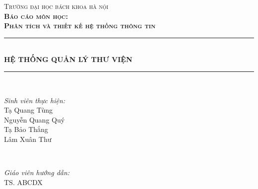 \documentclass[../report.tex]{subfiles}
\begin{document}
\begin{titlepage}

\newcommand{\HRule}{\rule{\linewidth}{0.5mm}} %

\center %
 
\textsc{\LARGE Trường đại học bách khoa hà nội}\\[1cm] %
\textsc{\large\bfseries Báo cáo môn học:} \\[0.2cm]
\textsc{\LARGE\bfseries Phân tích và thiết kế hệ thống thông tin}\\[1cm] %

\HRule \\[0.4cm]
{\Huge \bfseries HỆ THỐNG QUẢN LÝ THƯ VIỆN}\\[0.3cm] %
\HRule \\[1.5cm]

 
\begin{minipage}{0.4\textwidth}
\begin{flushleft} \large
\emph{Sinh viên thực hiện:}\\
Tạ Quang Tùng \\
Nguyễn Quang Quý \\
Tạ Bảo Thắng \\
Lâm Xuân Thư 
\end{flushleft}
\end{minipage}
~
\begin{minipage}{0.4\textwidth}
\begin{flushright} \large
\emph{Giáo viên hướng dẫn:} \\
TS. ABCDX
\end{flushright}
\end{minipage}\\[2cm]


\end{titlepage}
\end{document}
